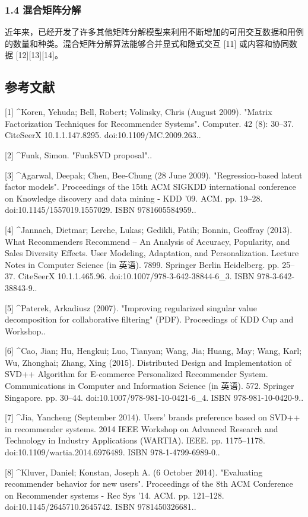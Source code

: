 \subsubsection{1.4 混合矩阵分解}
近年来，已经开发了许多其他矩阵分解模型来利用不断增加的可用交互数据和用例的数量和种类。混合矩阵分解算法能够合并显式和隐式交互 [11] 或内容和协同数据 [12][13][14]。

\subsection{参考文献}
[1]
^Koren, Yehuda; Bell, Robert; Volinsky, Chris (August 2009). "Matrix Factorization Techniques for Recommender Systems". Computer. 42 (8): 30–37. CiteSeerX 10.1.1.147.8295. doi:10.1109/MC.2009.263..

[2]
^Funk, Simon. "FunkSVD proposal"..

[3]
^Agarwal, Deepak; Chen, Bee-Chung (28 June 2009). "Regression-based latent factor models". Proceedings of the 15th ACM SIGKDD international conference on Knowledge discovery and data mining - KDD '09. ACM. pp. 19–28. doi:10.1145/1557019.1557029. ISBN 9781605584959..

[4]
^Jannach, Dietmar; Lerche, Lukas; Gedikli, Fatih; Bonnin, Geoffray (2013). What Recommenders Recommend – An Analysis of Accuracy, Popularity, and Sales Diversity Effects. User Modeling, Adaptation, and Personalization. Lecture Notes in Computer Science (in 英语). 7899. Springer Berlin Heidelberg. pp. 25–37. CiteSeerX 10.1.1.465.96. doi:10.1007/978-3-642-38844-6_3. ISBN 978-3-642-38843-9..

[5]
^Paterek, Arkadiusz (2007). "Improving regularized singular value decomposition for collaborative filtering" (PDF). Proceedings of KDD Cup and Workshop..

[6]
^Cao, Jian; Hu, Hengkui; Luo, Tianyan; Wang, Jia; Huang, May; Wang, Karl; Wu, Zhonghai; Zhang, Xing (2015). Distributed Design and Implementation of SVD++ Algorithm for E-commerce Personalized Recommender System. Communications in Computer and Information Science (in 英语). 572. Springer Singapore. pp. 30–44. doi:10.1007/978-981-10-0421-6_4. ISBN 978-981-10-0420-9..

[7]
^Jia, Yancheng (September 2014). Users' brands preference based on SVD++ in recommender systems. 2014 IEEE Workshop on Advanced Research and Technology in Industry Applications (WARTIA). IEEE. pp. 1175–1178. doi:10.1109/wartia.2014.6976489. ISBN 978-1-4799-6989-0..

[8]
^Kluver, Daniel; Konstan, Joseph A. (6 October 2014). "Evaluating recommender behavior for new users". Proceedings of the 8th ACM Conference on Recommender systems - Rec Sys '14. ACM. pp. 121–128. doi:10.1145/2645710.2645742. ISBN 9781450326681..

